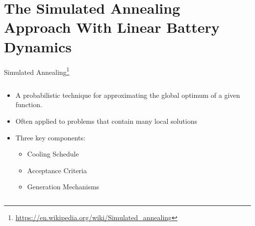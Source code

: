 \documentclass[aspectratio=169]{beamer}
\begin{document}
\section{The Simulated Annealing Approach With Linear Battery Dynamics}
\label{sec:org87305b1}
\begin{frame}[label={sec:org7cef068}]{Simulated Annealing\footnote{\url{https://en.wikipedia.org/wiki/Simulated\_annealing}}}
\begin{columns}
\begin{column}{0.5\columnwidth}
\begin{itemize}
\item A probabilistic technique for approximating the global optimum of a given function.
\item Often applied to problems that contain many local solutions
\item Three key components:
\begin{itemize}
\item Cooling Schedule
\item Acceptance Criteria
\item Generation Mechanisms
\end{itemize}
\end{itemize}
\end{column}

\begin{column}{0.5\columnwidth}
\centering
{}
\end{column}
\end{columns}
\end{frame}
\end{document}
